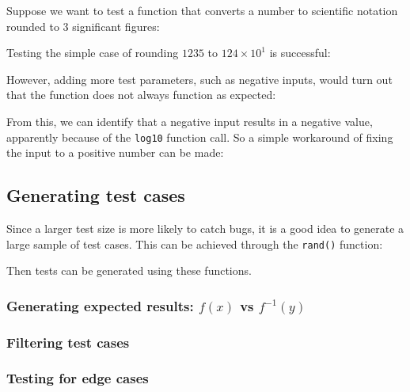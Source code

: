 Suppose we want to test a function that converts a number to scientific notation rounded to 3 significant figures:


Testing the simple case of rounding $1235$ to $124\times10^1$ is successful:


However, adding more test parameters, such as negative inputs, would turn out that the function does not always function as expected:


From this, we can identify that a negative input results in a negative value, apparently because of the \texttt{log10} function call.
So a simple workaround of fixing the input to a positive number can be made:


\subsection{Generating test cases}
Since a larger test size is more likely to catch bugs, it is a good idea to generate a large sample of test cases.
This can be achieved through the \texttt{rand()} function:


Then tests can be generated using these functions.

\subsubsection{Generating expected results: $f(x)$ vs $f^{-1}(y)$}


\subsubsection{Filtering test cases}



\subsubsection{Testing for edge cases}
